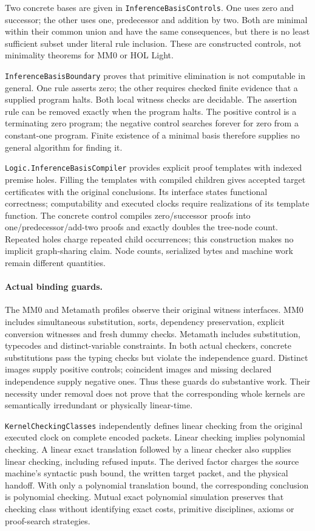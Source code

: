 \documentclass[11pt]{article}
\newcommand{\code}[1]{\nolinkurl{#1}}
\begin{document}
Two concrete bases are given in \code{InferenceBasisControls}. One uses zero
and successor; the other uses one, predecessor and addition by two. Both are minimal within their common union and have
the same consequences, but there is no least sufficient subset under literal
rule inclusion. These are constructed controls, not minimality theorems for
MM0 or HOL Light.

\code{InferenceBasisBoundary} proves that primitive elimination is not
computable in general. One rule asserts zero; the other requires checked
finite evidence that a supplied program halts. Both local witness checks
are decidable. The assertion rule can be removed exactly when the program
halts. The positive control is a terminating zero program; the negative
control searches forever for zero from a constant-one program. Finite
existence of a minimal basis therefore supplies no general algorithm for
finding it.

\code{Logic.InferenceBasisCompiler} provides explicit proof templates with
indexed premise holes. Filling the templates with compiled children gives
accepted target certificates with the original conclusions. Its interface
states functional correctness; computability and executed clocks require
realizations of its template function. The concrete control compiles
zero/successor proofs into one/predecessor/add-two proofs and exactly doubles
the tree-node count. Repeated holes charge repeated child occurrences;
this construction makes no implicit graph-sharing claim. Node counts,
serialized bytes and machine work remain different quantities.

\paragraph{Actual binding guards.}
The MM0 and Metamath profiles observe their original witness interfaces.
MM0 includes simultaneous substitution, sorts, dependency preservation,
explicit conversion witnesses and fresh dummy checks. Metamath includes
substitution, typecodes and distinct-variable constraints. In both actual
checkers, concrete substitutions pass the typing checks but violate the
independence guard. Distinct images supply positive controls; coincident
images and missing declared independence supply negative ones. Thus these
guards do substantive work. Their necessity under removal does not prove
that the corresponding whole kernels are semantically irredundant or
physically linear-time.

\code{KernelCheckingClasses} independently defines linear checking from the
original executed clock on complete encoded packets. Linear checking implies
polynomial checking. A linear exact translation followed by a linear checker
also supplies linear checking, including refused inputs. The derived factor
charges the source machine's syntactic push bound, the written target packet,
and the physical handoff. With only a polynomial translation bound, the
corresponding conclusion is polynomial checking. Mutual exact polynomial
simulation preserves that checking class without identifying exact costs,
primitive disciplines, axioms or proof-search strategies.
\end{document}

